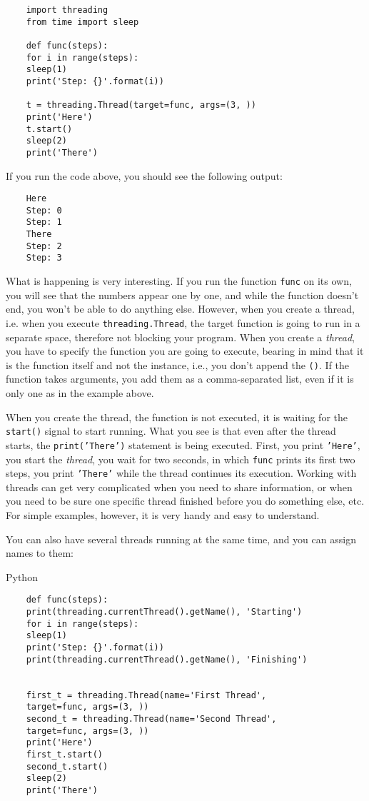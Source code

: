 \begin{verbatim}
    import threading
    from time import sleep

    def func(steps):
    for i in range(steps):
    sleep(1)
    print('Step: {}'.format(i))

    t = threading.Thread(target=func, args=(3, ))
    print('Here')
    t.start()
    sleep(2)
    print('There')
\end{verbatim}

If you run the code above, you should see the following output:

\begin{verbatim}
    Here
    Step: 0
    Step: 1
    There
    Step: 2
    Step: 3
\end{verbatim}

What is happening is very interesting. If you run the function
\texttt{func} on its own, you will see that the numbers appear one by
one, and while the function doesn't end, you won't be able to do
anything else. However, when you create a thread, i.e. when you execute
\texttt{threading.Thread}, the target function is going to run in a
separate space, therefore not blocking your program. When you create a
\emph{thread}, you have to specify the function you are going to
execute, bearing in mind that it is the function itself and not the
instance, i.e., you don't append the \texttt{()}. If the function takes
arguments, you add them as a comma-separated list, even if it is only
one as in the example above.

When you create the thread, the function is not executed, it is waiting
for the \texttt{start()} signal to start running. What you see is that
even after the thread starts, the
\texttt{print('There')} statement is
being executed. First, you print
\texttt{'Here'}, you start the
\emph{thread}, you wait for two seconds, in which \texttt{func} prints
its first two steps, you print
\texttt{'There'} while the thread
continues its execution. Working with threads can get very complicated
when you need to share information, or when you need to be sure one
specific thread finished before you do something else, etc. For simple
examples, however, it is very handy and easy to understand.

You can also have several threads running at the same time, and you can
assign names to them:

Python

\begin{verbatim}
    def func(steps):
    print(threading.currentThread().getName(), 'Starting')
    for i in range(steps):
    sleep(1)
    print('Step: {}'.format(i))
    print(threading.currentThread().getName(), 'Finishing')


    first_t = threading.Thread(name='First Thread',
    target=func, args=(3, ))
    second_t = threading.Thread(name='Second Thread',
    target=func, args=(3, ))
    print('Here')
    first_t.start()
    second_t.start()
    sleep(2)
    print('There')
\end{verbatim}

